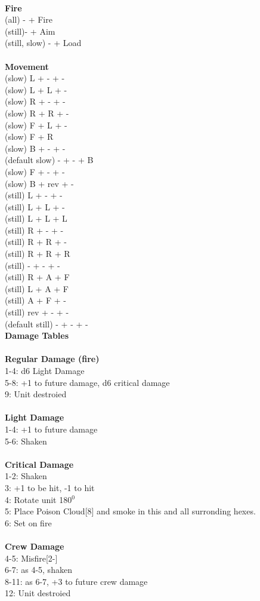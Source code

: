 \ \\ {\bf Fire } \\
(all) - + Fire \\
(still)- + Aim \\
(still, slow) - + Load \\
\ \\ {\bf Movement } \\
(slow) L + - + - \\
(slow) L + L + - \\
(slow) R + - + - \\
(slow) R + R + - \\
(slow) F + L + - \\
(slow) F + R \\
(slow) B + - + - \\
(default slow) - + - + B \\
(slow) F + - + - \\
(slow) B + rev + - \\
(still) L + - + - \\
(still) L + L + - \\
(still) L + L + L \\
(still) R + - + - \\
(still) R + R + - \\
(still) R + R + R \\
(still) - + - + - \\
(still) R + A + F \\
(still) L + A + F \\
(still) A + F + - \\
(still) rev + - + - \\
(default still) - + - + - \\



{\bf Damage Tables} \\
\ \\ {\bf Regular Damage (fire) } \\
1-4: d6 Light Damage \\
5-8: +1 to future damage, d6 critical damage \\
9: Unit destroied \\
\ \\ {\bf Light Damage } \\
1-4: +1 to future damage \\
5-6: Shaken \\
\ \\ {\bf Critical Damage } \\
1-2: Shaken \\
3: +1 to be hit, -1 to hit \\
4: Rotate unit 180$^0$ \\
5: Place Poison Cloud[8] and smoke in this and all surronding hexes. \\
6: Set on fire \\
\ \\ {\bf Crew Damage } \\
4-5: Misfire[2-] \\
6-7: as 4-5, shaken \\
8-11: as 6-7, +3 to future crew damage \\
12: Unit destroied \\


